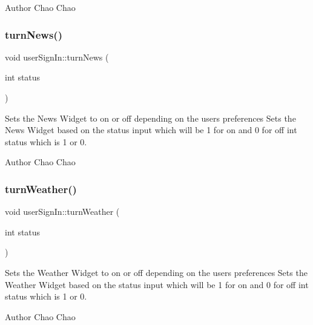 \begin{DoxyAuthor}{Author}
Chao Chao 
\end{DoxyAuthor}
\mbox{\label{classuser_sign_in_a6a95bd7b610abe178da1254e0234c858}} 
\subsubsection{\texorpdfstring{turn\+News()}{turnNews()}}
{\footnotesize\ttfamily void user\+Sign\+In\+::turn\+News (\begin{DoxyParamCaption}\item[{int}]{status }\end{DoxyParamCaption})}



Sets the News Widget to on or off depending on the user\textquotesingle{}s preferences  Sets the News Widget based on the status input which will be 1 for on and 0 for off  int status which is 1 or 0. 

\begin{DoxyAuthor}{Author}
Chao Chao 
\end{DoxyAuthor}
\mbox{\label{classuser_sign_in_afa427a5204b4ded7f066963439180e6c}} 
\subsubsection{\texorpdfstring{turn\+Weather()}{turnWeather()}}
{\footnotesize\ttfamily void user\+Sign\+In\+::turn\+Weather (\begin{DoxyParamCaption}\item[{int}]{status }\end{DoxyParamCaption})}



Sets the Weather Widget to on or off depending on the user\textquotesingle{}s preferences  Sets the Weather Widget based on the status input which will be 1 for on and 0 for off  int status which is 1 or 0. 

\begin{DoxyAuthor}{Author}
Chao Chao 
\end{DoxyAuthor}
\mbox{\label{classuser_sign_in_a9f9208482f5897e06a06be400d80bebe}} 
